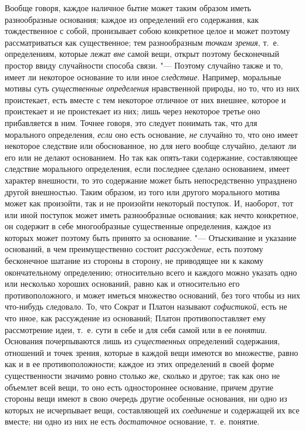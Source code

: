 Вообще говоря, каждое наличное бытие может таким образом иметь разнообразные
основания; каждое из определений его содержания, как тождественное с собой,
пронизывает собою конкретное целое и может поэтому рассматриваться как
существенное; тем разнообразным {\em точкам зрения},
т.~е. определениям, которые лежат {\em вне }самой вещи,
открыт поэтому бесконечный простор ввиду случайности способа связи. "---
Поэтому случайно также и то, имеет ли некоторое основание то или иное
{\em следствие}. Например, моральные мотивы суть
{\em существенные определения} нравственной природы, но
то, что из них проистекает, есть вместе с тем некоторое отличное от них
внешнее, которое и проистекает и не проистекает из них; лишь через
некоторое третье оно прибавляется в ним. Точнее говоря, это следует
понимать так, что для морального определения,
{\em если} оно есть основание,
{\em не} случайно то, что оно имеет некоторое следствие
или обоснованное, но для него вообще случайно, делают ли его или не делают
основанием. Но так как опять-таки содержание, составляющее следствие
морального определения, если последнее сделано основанием, имеет характер
внешности, то это содержание может быть непосредственно упразднено другой
внешностью. Таким образом, из того или другого морального мотива может как
произойти, так и не произойти некоторый поступок. И, наоборот, тот или иной
поступок может иметь разнообразные основания; как нечто конкретное, он
содержит в себе многообразные существенные определения, каждое из которых
может поэтому быть принято за основание. "--- Отыскивание и указание
оснований, в чем преимущественно состоит
{\em рассуждение}, есть поэтому бесконечное шатание из
стороны в сторону, не приводящее ни к какому окончательному определению;
относительно всего и каждого можно указать одно или несколько хороших
оснований, равно как и относительно его противоположного, и может иметься
множество оснований, без того чтобы из них что-нибудь следовало. То, что
Сократ и Платон называют {\em софистикой}, есть не что
иное, как рассуждение из оснований; Платон противопоставляет ему
рассмотрение идеи, т.~е. сути в себе и для себя самой или в ее
{\em понятии}. Основания почерпываются лишь из
{\em существенных} определений содержания, отношений и
точек зрения, которые в каждой вещи имеются во множестве, равно как и в ее
противоположности; каждое из этих определений в своей форме существенности
значимо ровно столько же, сколько и другое; так как оно не объемлет всей
вещи, то оно есть одностороннее основание, причем другие стороны вещи имеют
в свою очередь другие особенные основания, ни одно из которых не
исчерпывает вещи, составляющей их {\em соединение} и
содержащей их все вместе; ни одно из них не есть
{\em достаточное} основание, т.~е. понятие.

